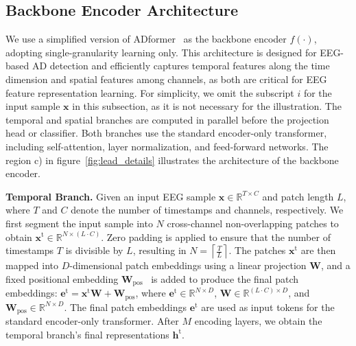 \subsection{Backbone Encoder Architecture}
\label{sub:backbone_encoder}
We use a simplified version of ADformer~\cite{wang2024adformer} as the backbone encoder $ f(\cdot) $, adopting single-granularity learning only. This architecture is designed for EEG-based AD detection and efficiently captures temporal features along the time dimension and spatial features among channels, as both are critical for EEG feature representation learning. For simplicity, we omit the subscript $ i $ for the input sample $ \bm{x} $ in this subsection, as it is not necessary for the illustration. The temporal and spatial branches are computed in parallel before the projection head or classifier. Both branches use the standard encoder-only transformer, including self-attention, layer normalization, and feed-forward networks. The region c) in figure~\ref{fig:lead_details} illustrates the architecture of the backbone encoder.

\textbf{Temporal Branch.}
Given an input EEG sample $\bm{x} \in \mathbb{R}^{T \times C}$ and patch length $L$, where $T$ and $C$ denote the number of timestamps and channels, respectively. We first segment the input sample into $N$ cross-channel non-overlapping patches to obtain $\bm{x}^{\text{t}} \in \mathbb{R}^{N \times (L \cdot C)}$. Zero padding is applied to ensure that the number of timestamps $T$ is divisible by $L$, resulting in $N = \left\lceil \frac{T}{L} \right\rceil$. The patches $\bm{x}^{\text{t}}$ are then mapped into $D$-dimensional patch embeddings using a linear projection $\bm{W}$, and a fixed positional embedding $\bm{W}_{\text{pos}}$~\cite{vaswani2017attention} is added to produce the final patch embeddings: $\bm{e}^{\text{t}} = \bm{x}^{\text{t}} \bm{W} + \bm{W}_{\text{pos}}$, where $\bm{e}^{\text{t}} \in \mathbb{R}^{N \times D}$, $\bm{W} \in \mathbb{R}^{(L \cdot C) \times D}$, and $\bm{W}_{\text{pos}} \in \mathbb{R}^{N \times D}$. The final patch embeddings $\bm{e}^{\text{t}}$ are used as input tokens for the standard encoder-only transformer. After $M$ encoding layers, we obtain the temporal branch's final representations $\bm{h}^{\text{t}}$.



